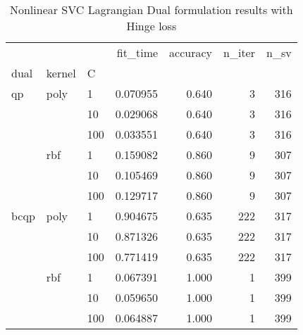 \begin{table}[H]
\centering
\caption{Nonlinear SVC Lagrangian Dual formulation results with Hinge loss}
\label{nonlinear_lagrangian_dual_svc_cv_results}
\begin{tabular}{lllrrrr}
\toprule
     &     &     &  fit\_time &  accuracy &  n\_iter &  n\_sv \\
dual & kernel & C &           &           &         &       \\
\midrule
qp & poly & 1   &  0.070955 &     0.640 &       3 &   316 \\
     &     & 10  &  0.029068 &     0.640 &       3 &   316 \\
     &     & 100 &  0.033551 &     0.640 &       3 &   316 \\
     & rbf & 1   &  0.159082 &     0.860 &       9 &   307 \\
     &     & 10  &  0.105469 &     0.860 &       9 &   307 \\
     &     & 100 &  0.129717 &     0.860 &       9 &   307 \\
bcqp & poly & 1   &  0.904675 &     0.635 &     222 &   317 \\
     &     & 10  &  0.871326 &     0.635 &     222 &   317 \\
     &     & 100 &  0.771419 &     0.635 &     222 &   317 \\
     & rbf & 1   &  0.067391 &     1.000 &       1 &   399 \\
     &     & 10  &  0.059650 &     1.000 &       1 &   399 \\
     &     & 100 &  0.064887 &     1.000 &       1 &   399 \\
\bottomrule
\end{tabular}
\end{table}
